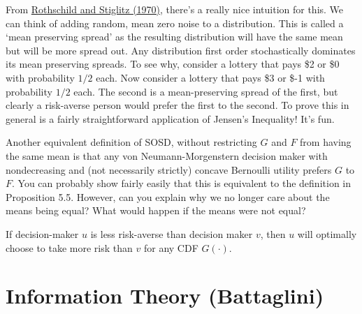 \documentclass[12pt]{article}
\begin{document}
\begin{remark}
	From \href{https://www.sciencedirect.com/science/article/abs/pii/0022053170900384}{Rothschild and Stiglitz (1970)}, there's a really nice intuition for this. We can think of adding random, mean zero noise to a distribution. This is called a `mean preserving spread' as the resulting distribution will have the same mean but will be more spread out. Any distribution first order stochastically dominates its mean preserving spreads. To see why, consider a lottery that pays \$2 or \$0 with probability $1/2$ each. Now consider a lottery that pays \$3 or \$-1 with probability $1/2$ each. The second is a mean-preserving spread of the first, but clearly a risk-averse person would prefer the first to the second. To prove this in general is a fairly straightforward application of Jensen's Inequality! It's fun.
\end{remark}

\begin{remark}
	Another equivalent definition of SOSD, without restricting $G$ and $F$ from having the same mean is that any von Neumann-Morgenstern decision maker with nondecreasing and (not necessarily strictly) concave Bernoulli utility prefers $G$ to $F$. You can probably show fairly easily that this is equivalent to the definition in Proposition 5.5. However, can you explain why we no longer care about the means being equal? What would happen if the means were not equal?
\end{remark}

\begin{proposition}
	If decision-maker $u$ is less risk-averse than decision maker $v$, then $u$ will optimally choose to take more risk than $v$ for any CDF $G(\cdot)$.
\end{proposition}



























\newpage
\section{Information Theory (Battaglini)}\label{sec:battaglini}
\end{document}
